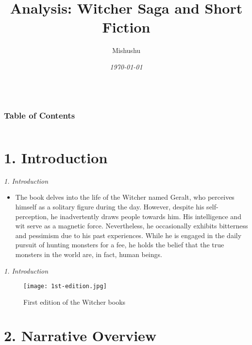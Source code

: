 \documentclass[xcolor=dvipsnames]{beamer}
\title[]{Analysis: Witcher Saga and Short Fiction}
\author[Mishushu]{Mishushu}
\date{\textit{\today}}
\begin{document}
\begin{frame}
\titlepage
\end{frame}

\begin{frame}
\vspace{0.5cm}
	\begin{columns}
		\begin{column}{0.95\linewidth}
			\frametitle{Table of Contents}
			\tableofcontents
		\end{column}
	\end{columns}
\end{frame}

\section{1. Introduction}
\begin{frame}{\textit{1. Introduction}}
    \begin{itemize}
        \item The book delves into the life of the Witcher named Geralt, who perceives himself as a solitary figure during the day. However, despite his self-perception, he inadvertently draws people towards him. His intelligence and wit serve as a magnetic force. Nevertheless, he occasionally exhibits bitterness and pessimism due to his past experiences. While he is engaged in the daily pursuit of hunting monsters for a fee, he holds the belief that the true monsters in the world are, in fact, human beings.
    \end{itemize}
\end{frame}

\begin{frame}{\textit{1. Introduction}}

\begin{figure}
\centering
\texttt{[image: 1st-edition.jpg]}
\caption{\label{fig:geralt}First edition of the Witcher books}
\end{figure}
    
\end{frame}{}

\section{2. Narrative Overview}
\end{document}
